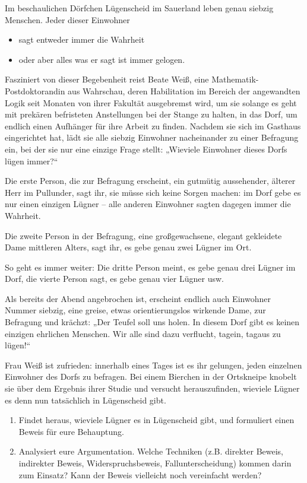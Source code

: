 \begin{aufg}
    Im beschaulichen Dörfchen Lügenscheid im Sauerland leben genau siebzig Menschen. Jeder dieser Einwohner 
    \begin{itemize}
        \item sagt entweder immer die Wahrheit
        \item oder aber alles was er sagt ist immer gelogen.
    \end{itemize}
    Fasziniert von dieser Begebenheit reist Beate Weiß, eine Mathematik-Postdoktorandin aus Wahrschau, deren Habilitation im Bereich der angewandten Logik seit Monaten von ihrer Fakultät ausgebremst wird, um sie solange es geht mit prekären befristeten Anstellungen bei der Stange zu halten, in das Dorf, um endlich einen Aufhänger für ihre Arbeit zu finden. Nachdem sie sich im Gasthaus eingerichtet hat, lädt sie alle siebzig Einwohner nacheinander zu einer Befragung ein, bei der sie nur eine einzige Frage stellt: „Wieviele Einwohner dieses Dorfs lügen immer?“
    
    Die erste Person, die zur Befragung erscheint, ein gutmütig aussehender, älterer Herr im Pullunder, sagt ihr, sie müsse sich keine Sorgen machen: im Dorf gebe es nur einen einzigen Lügner -- alle anderen Einwohner sagten dagegen immer die Wahrheit.
    
    Die zweite Person in der Befragung, eine großgewachsene, elegant gekleidete Dame mittleren Alters, sagt ihr, es gebe genau zwei Lügner im Ort.
    
    So geht es immer weiter: Die dritte Person meint, es gebe genau drei Lügner im Dorf, die vierte Person sagt, es gebe genau vier Lügner usw.
    
    Als bereits der Abend angebrochen ist, erscheint endlich auch Einwohner Nummer siebzig, eine greise, etwas orientierungslos wirkende Dame, zur Befragung und krächzt: „Der Teufel soll uns holen. In diesem Dorf gibt es keinen einzigen ehrlichen Menschen. Wir alle sind dazu verflucht, tagein, tagaus zu lügen!“
    
    Frau Weiß ist zufrieden: innerhalb eines Tages ist es ihr gelungen, jeden einzelnen Einwohner des Dorfs zu befragen. Bei einem Bierchen in der Ortskneipe knobelt sie über dem Ergebnis ihrer Studie und versucht herauszufinden, wieviele Lügner es denn nun tatsächlich in Lügenscheid gibt.
    \begin{enumerate}
        \item Findet heraus, wieviele Lügner es in Lügenscheid gibt, und formuliert einen Beweis für eure Behauptung.
        \item Analysiert eure Argumentation. Welche Techniken (z.B. direkter Beweis, indirekter Beweis, Widerspruchsbeweis, Fallunterscheidung) kommen darin zum Einsatz? Kann der Beweis vielleicht noch vereinfacht werden?
    \end{enumerate}
\end{aufg}

